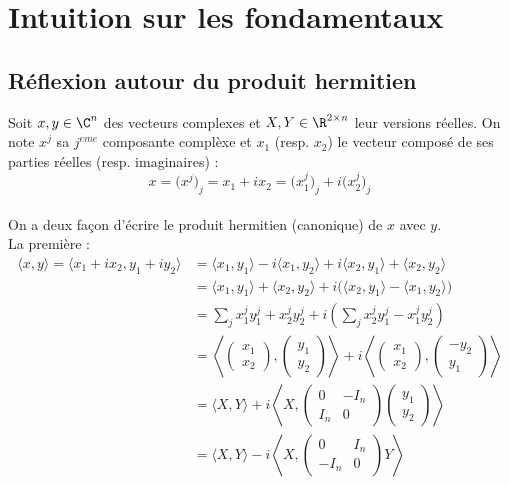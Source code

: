 \section{Intuition sur les fondamentaux}

\subsection{Réflexion autour du produit hermitien}

Soit $x,y\in\C^n$ des vecteurs complexes et $X,Y\in\R^{2\times n}$ leur versions réelles. On note $x^j$ sa $j^{eme}$ composante complèxe et $x_1$ (resp. $x_2$) le vecteur composé de ses parties réelles (resp. imaginaires) :
\[x = \big(x^j\big)_j =  x_1 + ix_2 =  \big(x^j_1\big)_j +i \big(x^j_2\big)_j\]
\\
On a deux façon d'écrire le produit hermitien (canonique) de $x$ avec $y$.
\\
La première :
\begin{align*}
\langle x,y \rangle = \langle x_1 + ix_2, y_1 + iy_2\rangle &= \langle x_1, y_1\rangle - i \langle x_1,y_2\rangle +i\langle x_2, y_1\rangle + \langle x_2, y_2\rangle  \\
&= \langle x_1, y_1\rangle + \langle x_2, y_2\rangle 
+ i\big(\langle x_2, y_1\rangle - \langle x_1,y_2\rangle\big) \\
&= \sum_j x^j_1 y^j_1+ x^j_2 y^j_2
+ i\left(\sum_j x^j_2 y^j_1 -  x^j_1y^j_2\right) \\
&= \left\langle \begin{pmatrix} x_1 \\ x_2 \end{pmatrix},\begin{pmatrix} y_1 \\ y_2 \end{pmatrix}\right\rangle
+ i\left\langle \begin{pmatrix} x_1 \\ x_2 \end{pmatrix},\begin{pmatrix} -y_2 \\ y_1 \end{pmatrix}\right\rangle \\
&= \Big\langle X,Y\Big\rangle 
+ i\left\langle X,\begin{pmatrix} 0 & -I_n \\ I_n & 0 \end{pmatrix}\begin{pmatrix} y_1 \\ y_2 \end{pmatrix}\right\rangle\\
&= \Big\langle X,Y\Big\rangle 
- i\left\langle X,\begin{pmatrix} 0 & I_n \\ -I_n & 0 \end{pmatrix}Y\right\rangle
\end{align*}
